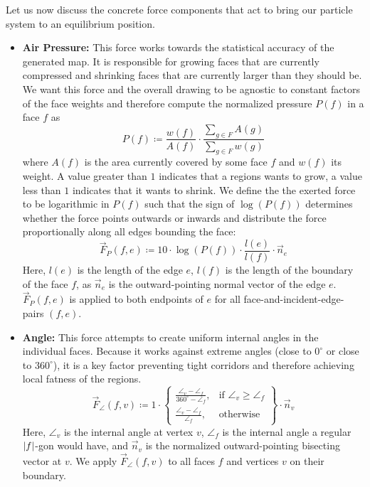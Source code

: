 Let us now discuss the concrete force components that act to bring our particle system to an equilibrium position.
%
\begin{itemize}
	\item \textbf{Air Pressure:}
	This force works towards the statistical accuracy of the generated map. It is responsible for growing faces that are currently compressed and shrinking faces that are currently larger than they should be. We want this force and the overall drawing to be agnostic to constant factors of the face weights and therefore compute the normalized pressure $P(f)$ in a face $f$ as
	$$P(f) \coloneqq \frac{w(f)}{A(f)} \cdot \frac{\sum\limits_{g \in F}{A(g)}}{\sum\limits_{g \in F}{w(g)}}$$
	where $A(f)$ is the area currently covered by some face $f$ and $w(f)$ its weight. A value greater than $1$ indicates that a regions wants to grow, a value less than $1$ indicates that it wants to shrink.
	We define the the exerted force to be logarithmic in $P(f)$ such that the sign of $\log(P(f))$ determines whether the force points outwards or inwards and distribute the force proportionally along all edges bounding the face:
	$$\vec{F}_P(f,e) \coloneqq 10 \cdot \log(P(f)) \cdot \frac{l(e)}{l(f)} \cdot \vec{n}_e$$
	Here, $l(e)$ is the length of the edge $e$, $l(f)$ is the length of the boundary of the face $f$, as $\vec{n}_e$ is the outward-pointing normal vector of the edge $e$. $\vec{F}_P(f,e)$ is applied to both endpoints of $e$ for all face-and-incident-edge-pairs $(f,e)$.

    \item \textbf{Angle:}
    This force attempts to create uniform internal angles in the individual faces. Because it works against extreme angles (close  to $0^\circ$ or close to $360^\circ$), it is a key factor preventing tight corridors and therefore achieving local fatness of the regions. 
    $$\vec{F}_\angle(f,v) \coloneqq 1 \cdot \left\{\begin{array}{lr}
    	\frac{\angle_v - \angle_f}{360^\circ - \angle_f}, & \text{if } \angle_v \geq \angle_f\\
    	\frac{\angle_v - \angle_f}{\angle_f}, & \text{otherwise}\end{array}
    \right\} \cdot \vec{n}_v$$
    Here, $\angle_v$ is the internal angle at vertex $v$, $\angle_f$ is the internal angle a regular $\left\lvert f\right\rvert$-gon would have, and $\vec{n}_v$ is the normalized outward-pointing bisecting vector at $v$. We apply $\vec{F}_\angle(f,v)$ to all faces $f$ and vertices $v$ on their boundary.


\end{itemize}
